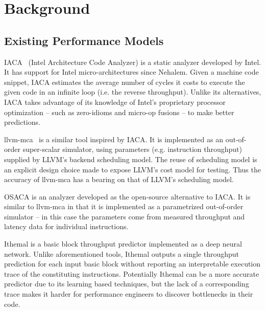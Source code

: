 \section{Background}

\subsection{Existing Performance Models}
IACA~\cite{iaca} (Intel Architecture Code Analyzer) is a static analyzer
developed by Intel. It has support for Intel micro-architectures
since Nehalem.
Given a machine code snippet, IACA estimates the average number
of cycles it costs to execute the given code in an infinite 
loop (i.e. the reverse throughput).
Unlike its alternatives, IACA takes advantage of its knowledge
of Intel's proprietary processor optimization
-- such as zero-idioms and micro-op fusions -- to make better 
predictions.

llvm-mca~\cite{llvm-mca} is a similar tool inspired by IACA. 
It is implemented as an out-of-order super-scalar simulator,
using parameters (e.g. instruction throughput)
supplied by LLVM\cite{llvm}'s backend scheduling model.
The reuse of scheduling model is an explicit design choice
made to expose LLVM's cost model for testing.
Thus the accuracy of llvm-mca has a bearing on
that of LLVM's scheduling model.

OSACA\cite{osaca} is an analyzer developed as the open-source
alternative to IACA. It is similar to llvm-mca in that
it is implemented as a parametrized out-of-order simulator
-- in this case the parameters come from measured throughput
and latency data for individual instructions.

Ithemal\cite{ithemal} is a basic block throughput predictor
implemented as a deep neural network. Unlike aforementioned 
tools, Ithemal outputs a single throughput prediction for each
input basic block without reporting an interpretable execution
trace of the constituting instructions.
Potentially Ithemal can be a more accurate predictor
due to its learning based techniques, but the lack of a corresponding 
trace makes it harder for performance engineers to discover
bottlenecks in their code.

